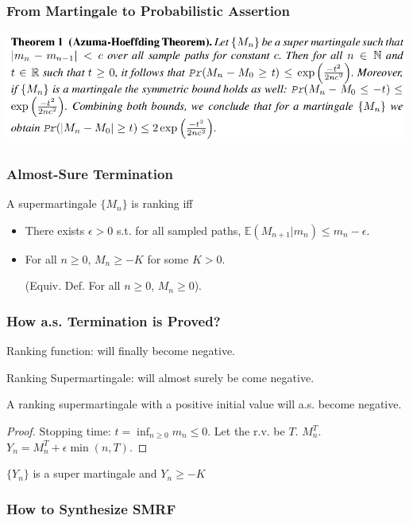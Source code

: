 \documentclass[11pt]{beamer}
\begin{document}
\begin{frame}\frametitle{From Martingale to Probabilistic Assertion}

\begin{center}
\includegraphics[scale=0.35]{azuma.png}
\end{center}

\end{frame}

\begin{frame}\frametitle{Almost-Sure Termination}

\begin{definition}

A supermartingale $\{M_n\}$ is ranking iff
\begin{itemize}
\item There exists $\epsilon > 0$ s.t. for all sampled paths, $\mathbb{E}(M_{n+1}|m_n) \le m_n - \epsilon$.

\item For all $n\ge 0$, $M_n \ge -K$ for some $K >0$. 

(Equiv. Def. For all $n\ge 0$, $M_n\ge 0$).
\end{itemize}
\end{definition}
\end{frame}

\begin{frame}\frametitle{How a.s. Termination is Proved?}
Ranking function: will finally become negative.

Ranking Supermartingale: will almost surely be come negative.
\pause
\begin{theorem}
A ranking supermartingale with a positive initial value will a.s. become negative.
\end{theorem}
\pause
\begin{proof}
Stopping time: $t = \inf_{n\ge 0} m_n\le 0$. Let the r.v. be $T$.
$M_{n}^{T}$. 
$Y_n = M_{n}^{T} + \epsilon\min(n,T)$.
\end{proof}
\pause
\begin{lemma}
$\{Y_n\}$ is a super martingale and $Y_n \ge -K$
\end{lemma}

\end{frame}


\begin{frame}\frametitle{How to Synthesize SMRF}

\end{frame}
\end{document}
